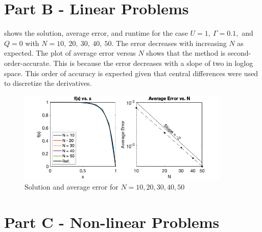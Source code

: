 \documentclass[reqno]{amsart}
\begin{document}
    \section{Part B - Linear Problems}
     shows the solution, average error, and runtime for the case $U = 1,\ \Gamma = 0.1,$ and $Q = 0$ with $N = 10,\ 20,\ 30,\ 40,\ 50.$
    The error decreases with increasing $N$ as expected.
    The plot of average error versus $N$ shows that the method is second-order-accurate.
    This is because the error decreases with a slope of two in loglog space.
    This order of accuracy is expected given that central differences were used to discretize the derivatives.
    \begin{figure}
        \centering
        \includegraphics[width=4in]{partA.png}
        \caption{Solution and average error for $N = 10, 20, 30, 40, 50$}
        \label{fig:B}
    \end{figure}

    \section{Part C - Non-linear Problems}
\end{document}

